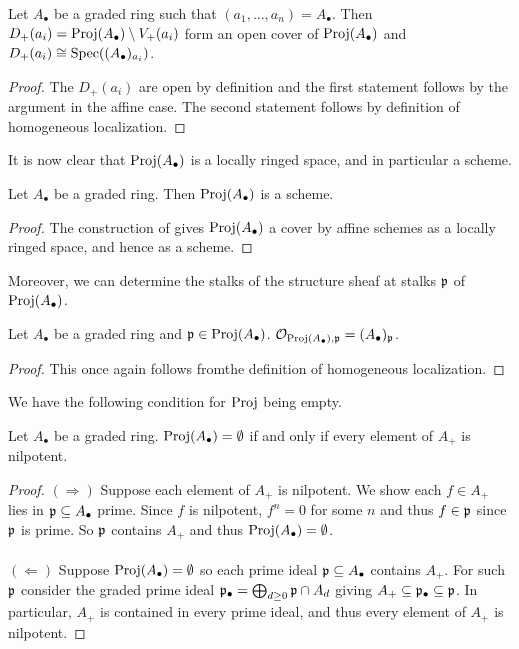 \begin{proposition}\label{prop: covering of proj}
    Let $A_{\bullet}$ be a graded ring such that $(a_{1},\dots,a_{n})=A_{\bullet}$. Then $D_{+}(a_{i})=\operatorname{Proj}(A_{\bullet})\setminus V_{+}(a_{i})$ form an open cover of $\operatorname{Proj}(A_{\bullet})$ and $D_{+}(a_{i})\cong\operatorname{Spec}((A_{\bullet})_{a_{i}})$. 
\end{proposition}
\begin{proof}
    The $D_{+}(a_{i})$ are open by definition and the first statement follows by the argument in the affine case. The second statement follows by definition of homogeneous localization. 
\end{proof}
It is now clear that $\operatorname{Proj}(A_{\bullet})$ is a locally ringed space, and in particular a scheme. 
\begin{corollary}\label{corr: proj is a scheme}
    Let $A_{\bullet}$ be a graded ring. Then $\operatorname{Proj}(A_{\bullet})$ is a scheme. 
\end{corollary}
\begin{proof}
    The construction of  gives $\operatorname{Proj}(A_{\bullet})$ a cover by affine schemes as a locally ringed space, and hence as a scheme. 
\end{proof}
Moreover, we can determine the stalks of the structure sheaf at stalks $\mathfrak{p}$ of $\operatorname{Proj}(A_{\bullet})$.
\begin{corollary}\label{corr: stalk of projective scheme}
    Let $A_{\bullet}$ be a graded ring and $\mathfrak{p}\in\operatorname{Proj}(A_{\bullet})$. $\mathcal{O}_{\operatorname{Proj}(A_{\bullet}),\mathfrak{p}}=(A_{\bullet})_{\mathfrak{p}}$. 
\end{corollary}
\begin{proof}
    This once again follows fromthe definition of homogeneous localization. 
\end{proof}
We have the following condition for $\operatorname{Proj}$ being empty. 
\begin{proposition}
    Let $A_{\bullet}$ be a graded ring. $\operatorname{Proj}(A_{\bullet})=\emptyset$ if and only if every element of $A_{+}$ is nilpotent. 
\end{proposition}
\begin{proof}
    $(\Longrightarrow)$ Suppose each element of $A_{+}$ is nilpotent. We show each $f\in A_{+}$ lies in $\mathfrak{p}\subseteq A_{\bullet}$ prime. Since $f$ is nilpotent, $f^{n}=0$ for some $n$ and thus $f\in \mathfrak{p}$ since $\mathfrak{p}$ is prime. So $\mathfrak{p}$ contains $A_{+}$ and thus $\operatorname{Proj}(A_{\bullet})=\emptyset$.
    \\\\
    $(\Longleftarrow)$ Suppose $\operatorname{Proj}(A_{\bullet})=\emptyset$ so each prime ideal $\mathfrak{p}\subseteq A_{\bullet}$ contains $A_{+}$. For such $\mathfrak{p}$ consider the graded prime ideal $\mathfrak{p}_{\bullet}=\bigoplus_{d\geq0}\mathfrak{p}\cap A_{d}$ giving $A_{+}\subseteq\mathfrak{p}_{\bullet}\subseteq\mathfrak{p}$. In particular, $A_{+}$ is contained in every prime ideal, and thus every element of $A_{+}$ is nilpotent. 
\end{proof}
